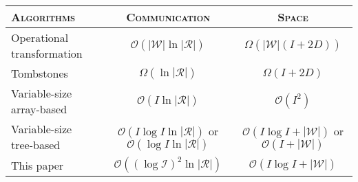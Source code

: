 

\begin{tabular}{@{}lcc@{}}
  \toprule
  \textsc{Algorithms} & \textsc{Communication} & \textsc{Space} \\ \midrule 
  Operational transformation~\cite{suleiman1997serialization, sun2009contextbased} & $\mathcal{O}(|\mathcal{W}|\ln|\mathcal{R}|)$ & $\Omega (|\mathcal{W}|(I+2D))$ \\ \midrule
  Tombstones~\cite{ahmed2011evaluating, oster2006data, weiss2007wooki} & $\Omega (\ln|\mathcal{R}|)$ & $\Omega (I+2D)$ \\ \midrule
  Variable-size array-based~\cite{weiss2009logoot} & $\mathcal{O}(I\ln |\mathcal{R}|)$ & $\mathcal{O}(I^2)$ \\ \midrule
  Variable-size tree-based~\cite{preguica2009commutative} & $\mathcal{O}(I\log I \ln |\mathcal{R}|)$ or $\mathcal{O}(\log I\ln|\mathcal{R}|)$ & $\mathcal{O}(I\log I + |\mathcal{W}|)$ or $\mathcal{O}(I + |\mathcal{W}|)$ \\ \midrule
  This paper~\cite{nedelec2013lseq} & $\mathcal{O}((\log \mathcal{I})^2\ln|\mathcal{R}|)$ & $\mathcal{O}(I\log I + |\mathcal{W}|)$ \\ \bottomrule
\end{tabular}

